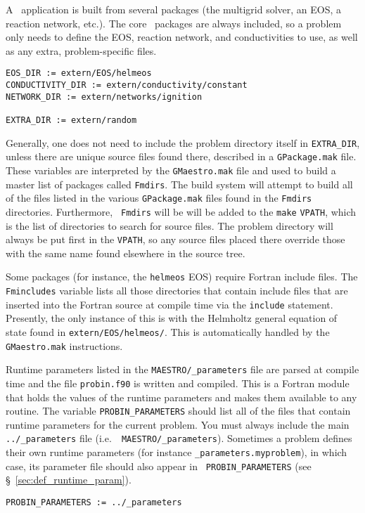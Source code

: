 A \maestro\ application is built from several packages (the
multigrid solver, an EOS, a reaction network, etc.).  The core
\maestro\ packages are always included, so a problem only needs
to define the EOS, reaction network, and conductivities to
use, as well as any extra, problem-specific files.  
\begin{lstlisting}[language={[gnu]make},mathescape=false]
EOS_DIR := extern/EOS/helmeos   
CONDUCTIVITY_DIR := extern/conductivity/constant
NETWORK_DIR := extern/networks/ignition

EXTRA_DIR := extern/random
\end{lstlisting}
Generally, one does not need to include the problem directory itself
in {\tt EXTRA\_DIR}, unless there are unique source files found there,
described in a {\tt GPackage.mak} file.  These variables are
interpreted by the {\tt GMaestro.mak} file and used to build a master
list of packages called {\tt Fmdirs}.  The build system will attempt
to build all of the files listed in the various {\tt GPackage.mak}
files found in the {\tt Fmdirs} directories.  Furthermore, {\tt
  Fmdirs} will be will be added to the {\tt make} {\tt VPATH}, which
is the list of directories to search for source files.  The problem
directory will always be put first in the {\tt VPATH}, so any source
files placed there override those with the same name found elsewhere
in the source tree.  

Some packages (for instance, the {\tt helmeos}
EOS) require Fortran include files.  The {\tt Fmincludes} variable
lists all those directories that contain include files that are
inserted into the Fortran source at compile time via the {\tt include}
statement.  Presently, the only instance of this is with the Helmholtz
general equation of state found in {\tt extern/EOS/helmeos/}.  This is
automatically handled by the {\tt GMaestro.mak} instructions.

Runtime parameters listed in the {\tt MAESTRO/\_parameters} file are
parsed at compile time and the file {\tt probin.f90} is written and
compiled.  This is a Fortran module that holds the values of the
runtime parameters and makes them available to any routine.  The
variable {\tt PROBIN\_PARAMETERS} should list all of the files that
contain runtime parameters for the current problem.  You must always
include the main {\tt ../\_parameters} file (i.e.\ {\tt
  MAESTRO/\_parameters}).  Sometimes a problem defines their own
runtime parameters (for instance {\tt \_parameters.myproblem}), in which
case, its parameter file should also appear in {\tt
  PROBIN\_PARAMETERS} (see \S~\ref{sec:def_runtime_param}).
\begin{lstlisting}[language={[gnu]make},mathescape=false]
  PROBIN_PARAMETERS := ../_parameters
\end{lstlisting}

